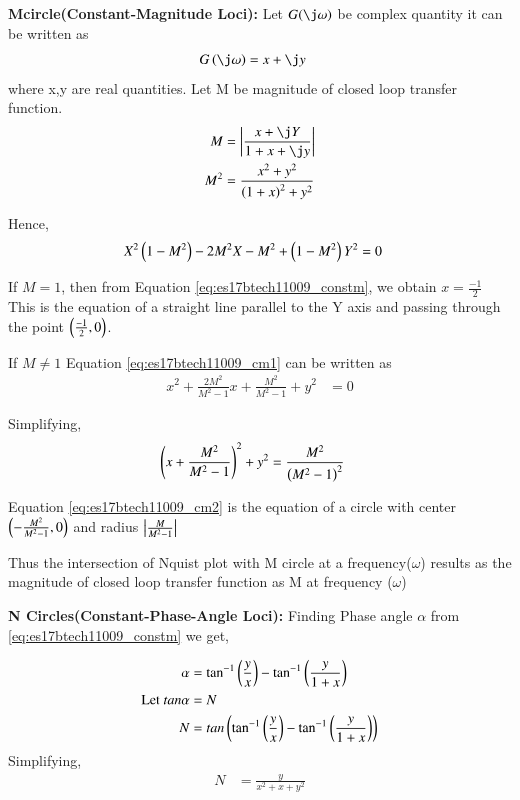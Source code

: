 \begin{enumerate}[label=\thesection.\arabic*.,ref=\thesection.\theenumi]
\textbf{Mcircle(Constant-Magnitude Loci):} Let $G(\j\omega)$ be complex quantity it can be written as 
\begin{align}
G\brak{\j \omega} &= x+\j y
\end{align}
where x,y are real quantities.
Let M be magnitude of closed loop transfer function.
\begin{align}
M &= \abs{\frac{x+\j Y}{1+x+\j y}}
\\
M^{2} &= \frac{x^{2}+y^{2}}{\brak{1+x}^{2}+y^{2}}
\label{eq:es17btech11009_constm}
\end{align}

Hence,
\begin{align}
X^{2}\brak{1-M^{2}}-2M^{2}X-M^{2}+\brak{1-M^{2}}Y^{2} &= 0
\label{eq:es17btech11009_cm1}
\end{align}

If $M=1$, then from Equation \eqref{eq:es17btech11009_constm}, we obtain $x =\frac{-1}{2}$ This is the equation of a straight line parallel to the Y axis and passing through the point $\left(\frac{-1}{2},0\right)$.

If $M \neq 1$ Equation \eqref{eq:es17btech11009_cm1} can be written as
\begin{align}
x^{2}+\frac{2M^{2}}{M^{2}-1}x+\frac{M^{2}}{M^{2}-1}+y^{2} &= 0
\end{align}

Simplifying,
\begin{align}
\brak{x+\frac{M^{2}}{M^{2}-1}}^{2}+y^{2} &= \frac{M^{2}}{\brak{M^{2}-1}^{2}}
\label{eq:es17btech11009_cm2}
\end{align}

Equation \eqref{eq:es17btech11009_cm2} is the equation of a circle with center 
$\left(-\frac{M^{2}}{M^{2}-1},0\right)$ and radius $\left\vert\frac{M}{M^{2}-1}\right\vert$

Thus the intersection of Nquist plot with M circle at a frequency($\omega$) results as the magnitude of closed loop transfer function as M at frequency ($\omega$)

\textbf{N Circles(Constant-Phase-Angle Loci):}
Finding Phase angle $\alpha$ from \eqref{eq:es17btech11009_constm} we get,

\begin{align}
\alpha &= \tan^{-1}\left(\frac{y}{x}\right)-\tan^{-1}\left(\frac{y}{1+x}\right)
\\
\text{Let } tan\alpha &= N
\\
N &= tan\left(\tan^{-1}\left(\frac{y}{x}\right)-\tan^{-1}\left(\frac{y}{1+x}\right)\right)
\end{align}
Simplifying,
\begin{align}
N &= \frac{y}{x^{2}+x+y^{2}}
\end{align}


\end{enumerate}

